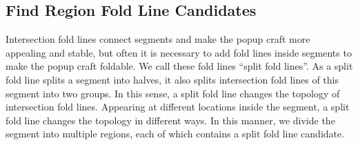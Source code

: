 

\subsection{Find Region Fold Line Candidates} \label{split_fold_line_candidates}
Intersection fold lines connect segments and make the popup craft more appealing and stable, but often it is necessary to add fold lines inside segments to make the popup craft foldable. We call these fold lines ``split fold lines''. As a split fold line splits a segment into halves, it also splits intersection fold lines of this segment into two groups. In this sense, a split fold line changes the topology of intersection fold lines. Appearing at different locations inside the segment, a split fold line changes the topology in different ways. In this manner, we divide the segment into multiple regions, each of which contains a split fold line candidate.


